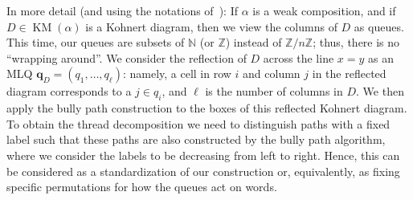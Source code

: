 \documentclass[reqno]{amsart}
\newcommand{\0}{\phantom{c}}
\DeclareMathOperator{\KM}{KM}
\newcommand{\qq}{\mathbf{q}}
\newcommand{\NN}{\mathbb{N}}
\newcommand{\ZZ}{\mathbb{Z}}
\theoremstyle{plain}
\theoremstyle{definition}
\numberwithin{equation}{section}
\begin{document}
In more detail (and using the notations of~\cite{AssSea18}):
If $\alpha$ is a weak composition, and if $D \in \KM(\alpha)$ is a Kohnert diagram, then we view the columns of $D$ as queues.
This time, our queues are subsets of $\NN$ (or $\ZZ$) instead of $\ZZ/n\ZZ$; thus, there is no ``wrapping around''.
We consider the reflection of $D$ across the line $x = y$ as an MLQ $\qq_D = (q_1, \dotsc, q_{\ell})$:
namely, a cell in row $i$ and column $j$ in the reflected diagram corresponds to a $j \in q_i$,
and $\ell$ is the number of columns in $D$.
We then apply the bully path construction to the boxes of this reflected Kohnert diagram.
To obtain the thread decomposition we need to distinguish paths with a fixed label such that these paths are also constructed by the bully path algorithm, where we consider the labels to be decreasing from left to right.
Hence, this can be considered as a standardization of our construction or, equivalently, as fixing specific permutations for how the queues act on words.
\end{document}

